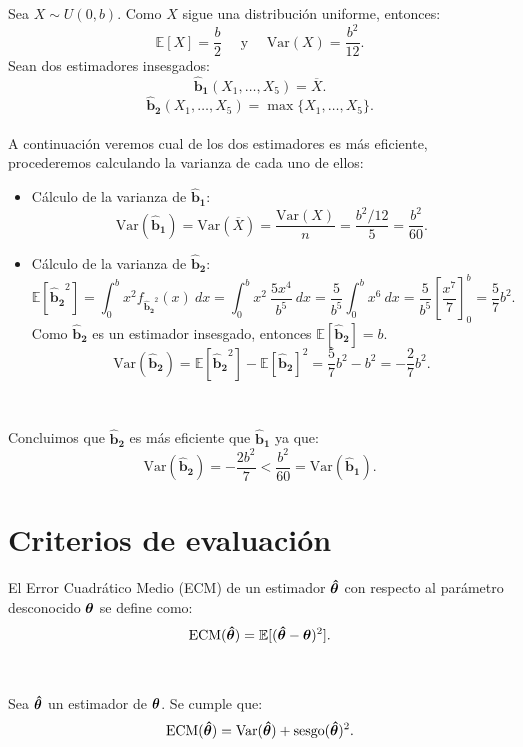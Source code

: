 \documentclass[oneside,openright,titlepage,numbers=noenddot,openany,headinclude,footinclude=true,
cleardoublepage=empty,abstractoff,BCOR=5mm,paper=a4,fontsize=12pt,main=spanish]{scrreprt}
\begin{document}
\begin{example} \label{ex:eficienciaex}
Sea $X \sim U(0,b)$.
Como $X$ sigue una distribución uniforme, entonces: $$\mathbb{E}[X]=\frac{b}{2} \quad \text{ y } \quad \text{Var}(X)=\frac{b^2}{12}.$$
Sean dos estimadores insesgados:
$$\bm{\hat{b}_1}(X_1,\dots,X_{5})=\overline{X}.$$
$$\bm{\hat{b}_2}(X_1,\dots,X_{5})=\max \{X_1,\dots,X_5\}.$$\\
A continuación veremos cual de los dos estimadores es más eficiente, procederemos calculando la varianza de cada uno de ellos:\\

\begin{itemize}
    \item Cálculo de la varianza de $\bm{\hat{b}_1}$: $$\text{Var}(\bm{\hat{b}_1})=\text{Var}(\overline{X})=\frac{\text{Var}(X)}{n}=\frac{b^2/12}{5}=\frac{b^2}{60}.$$
    \item Cálculo de la varianza de $\bm{\hat{b}_2}$: $$\mathbb{E}\left[\bm{\hat{b}_2}^2\right]=\int_{0}^b x^2 f_{\bm{\hat{b}_2}^2}(x) \ dx=\int_{0}^b x^2 \ \frac{5x^4}{b^5} \ dx=\frac{5}{b^5}\int_{0}^b x^6 \ dx=\frac{5}{b^5}\left[\frac{x^7}{7}\right]_{0}^b=\frac{5}{7}b^2.$$
    Como $\bm{\hat{b}_2}$ es un estimador insesgado, entonces $\mathbb{E}[\bm{\hat{b}_2}]=b$.
    $$\text{Var}\left(\bm{\hat{b}_2}\right)=\mathbb{E}\left[\bm{\hat{b}_2}^2\right]-\mathbb{E}\left[\bm{\hat{b}_2}\right]^2=\frac{5}{7}b^2-b^2=-\frac{2}{7}b^2.$$
\end{itemize}\

Concluimos que $\bm{\hat{b}_2}$ es más eficiente que $\bm{\hat{b}_1}$ ya que: $$\text{Var}(\bm{\hat{b}_2})= -\frac{2b^2}{7} < \frac{b^2}{60}=\text{Var}(\bm{\hat{b}_1}).$$
\end{example}

\clearpage

\section{Criterios de evaluación}

\begin{definition}
El Error Cuadrático Medio (ECM) de un estimador $\bm{\hat{\theta}}$ con respecto al parámetro desconocido $\bm{\theta}$  se define como: $$\text{ECM}(\bm{\hat{\theta}})=\mathbb{E}[(\bm{\hat{\theta}}-\bm{\theta})^2].$$
\end{definition}\

\begin{proposition}
Sea $\bm{\hat{\theta}}$ un estimador de $\bm{\theta}$. Se cumple que:
$$\text{ECM}(\bm{\hat{\theta}})=\text{Var}(\bm{\hat{\theta}})+\text{sesgo}(\bm{\hat{\theta}})^2.$$
\end{proposition}
\end{document}
